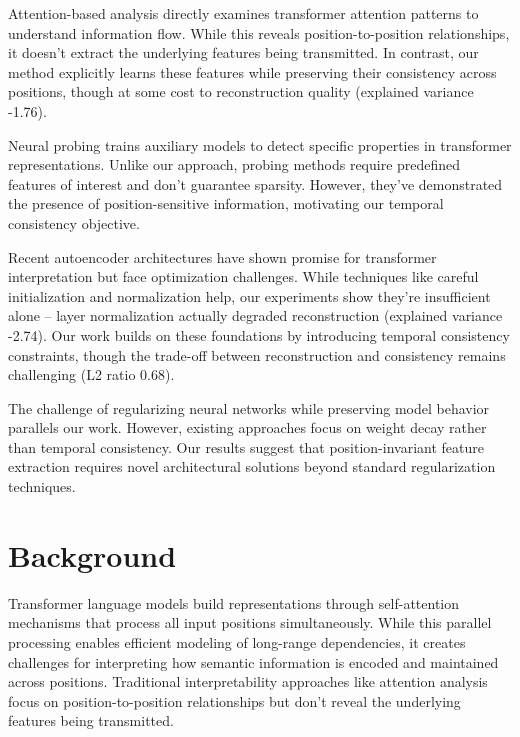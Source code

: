 \documentclass{article} %
\begin{document}
Attention-based analysis \cite{vaswani2017attention} directly examines transformer attention patterns to understand information flow. While this reveals position-to-position relationships, it doesn't extract the underlying features being transmitted. In contrast, our method explicitly learns these features while preserving their consistency across positions, though at some cost to reconstruction quality (explained variance -1.76).

Neural probing \cite{bahdanau2014neural} trains auxiliary models to detect specific properties in transformer representations. Unlike our approach, probing methods require predefined features of interest and don't guarantee sparsity. However, they've demonstrated the presence of position-sensitive information, motivating our temporal consistency objective.

Recent autoencoder architectures \cite{goodfellow2016deep} have shown promise for transformer interpretation but face optimization challenges. While techniques like careful initialization \cite{kingma2014adam} and normalization \cite{ba2016layer} help, our experiments show they're insufficient alone -- layer normalization actually degraded reconstruction (explained variance -2.74). Our work builds on these foundations by introducing temporal consistency constraints, though the trade-off between reconstruction and consistency remains challenging (L2 ratio 0.68).

The challenge of regularizing neural networks while preserving model behavior \cite{loshchilov2017adamw} parallels our work. However, existing approaches focus on weight decay rather than temporal consistency. Our results suggest that position-invariant feature extraction requires novel architectural solutions beyond standard regularization techniques.

\section{Background}
\label{sec:background}

Transformer language models \cite{vaswani2017attention} build representations through self-attention mechanisms that process all input positions simultaneously. While this parallel processing enables efficient modeling of long-range dependencies, it creates challenges for interpreting how semantic information is encoded and maintained across positions. Traditional interpretability approaches like attention analysis focus on position-to-position relationships but don't reveal the underlying features being transmitted.
\end{document}
